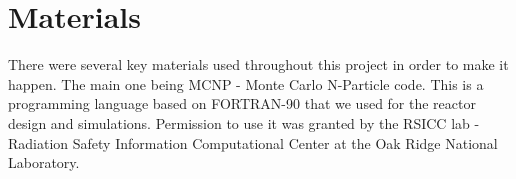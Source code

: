\section*{Materials}
There were several key materials used throughout this project in order to make it happen. The main one being MCNP - Monte Carlo N-Particle code. This is a programming language based on FORTRAN-90 that we used for the reactor design and simulations. Permission to use it was granted by the RSICC lab - Radiation Safety Information Computational Center at the Oak Ridge National Laboratory.